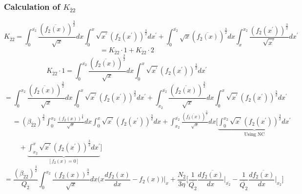 \documentclass[fleqn, 10pt]{article}
\begin{document}
\subsubsection{Calculation of $K_{\overline{2}2}$}
\begin{equation}
    K_{\overline{2}2} = \int^{\overline{x_{2}}}_{0} \frac{(\overline{f_{2}(x)})^\frac{3}{2}}{\sqrt{x}}dx \int^{x}_{0}\sqrt{x^\prime} (f_{2}(x^\prime))^\frac{3}{2} dx^\prime + \int^{\overline{x_{2}}}_{0} \sqrt{x} (\overline{f_{2}(x)})^\frac{3}{2}dx \int^{x_{2}}_{x} \frac{(f_{2}(x^\prime))^\frac{3}{2}}{\sqrt{x^\prime}}dx^\prime
\end{equation}
\begin{equation}
    = K_{\overline{2}2} \cdot 1 + K_{\overline{2}2} \cdot 2 
\end{equation}
\begin{equation}
    K_{\overline{2}2} \cdot 1 = \int^{\overline{x_{2}}}_{0} \frac{(\overline{f_{2}(x)})^\frac{3}{2}}{\sqrt{x}} dx \int^{x}_{0} \sqrt{x^\prime} (f_{2}(x^\prime))^\frac{3}{2} dx^\prime
\end{equation}
\begin{equation*}
     = \int^{x_{2}}_{0} \frac{(\overline{f_{2}(x)})^\frac{3}{2}}{\sqrt{x}} dx \int^{x}_{0} \sqrt{x^\prime} (f_{2}(x^\prime))^\frac{3}{2} dx^\prime + \int^{\overline{x_{2}}}_{x_{2}} \frac{(\overline{f_{2}(x)})^\frac{3}{2}}{\sqrt{x}} dx \int^{x}_{0} \sqrt{x^\prime} (f_{2}(x^\prime))^\frac{3}{2} dx^\prime
\end{equation*}
\begin{equation*}
\begin{split}
    & = (\beta_{\overline{2}2})^\frac{3}{2} \int^{x_{2}}_{0} \frac{(f_{2}(x))^\frac{3}{2}}{\sqrt{x}}dx \int^{x}_{0} \sqrt{x^\prime} (f_{2}(x^\prime))^\frac{3}{2} dx + \int^{\overline{x_{2}}}_{x_{2}} \frac{(\overline{f_{2}(x)})^\frac{3}{2}}{\sqrt{x}} dx  \biggl[ \underbrace{\int^{x_{2}}_{0} \sqrt{x^\prime} (f_{2}(x^\prime))^\frac{3}{2} dx^\prime }_{\text{Using NC}} \\ & \quad + \underbrace{\int^{x}_{x_{2}} \sqrt{x^\prime} (f_{2}(x^\prime))^\frac{3}{2} dx^\prime}_{[f_{2}(x) = 0 ]} \biggr] 
    \end{split}
\end{equation*}
\begin{equation}
     = \frac{(\beta_{\overline{2}2})^\frac{3}{2}}{Q_{2}} \int^{x_{2}}_{0} \frac{(f_{2}(x))^\frac{3}{2}}{\sqrt{x}}dx \biggl( x\frac{df_{2}(x)}{dx} - f_{2}(x) \biggr) \biggr|_{x} + \frac{N_{2}}{3\eta} \biggl[ \frac{1}{\overline{Q_{2}}} \frac{d\overline{f_{2}(x)}}{dx} \biggr|_{\overline{x_{2}}} - \frac{1}{\overline{Q_{2}}} \frac{d\overline{f_{2}(x)}}{dx}\biggr|_{x_{2}} \biggr]
\end{equation}
\end{document}
